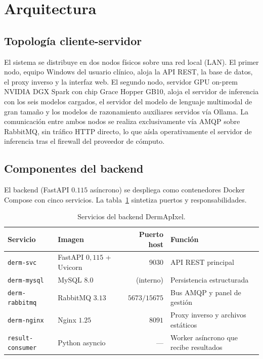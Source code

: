 \section{Arquitectura}
\label{sec:dermapixel-arq}

\subsection{Topología cliente-servidor}
\label{sec:dermapixel-topologia}

El sistema se distribuye en dos nodos físicos sobre una red local
(LAN). El primer nodo, equipo Windows del usuario clínico,
aloja la API REST, la base de datos, el
proxy inverso y la interfaz web. El segundo nodo, servidor GPU
on-prem NVIDIA DGX Spark con chip Grace Hopper GB10, aloja el
servidor de inferencia con los seis modelos cargados, el
servidor del modelo de lenguaje multimodal de gran tamaño y los
modelos de razonamiento auxiliares servidos vía Ollama. La
comunicación entre ambos nodos se realiza exclusivamente vía AMQP
sobre RabbitMQ, sin tráfico HTTP directo, lo que aísla
operativamente el servidor de inferencia tras el firewall del
proveedor de cómputo.

\subsection{Componentes del backend}
\label{sec:dermapixel-backend}

El backend (FastAPI $0.115$ asíncrono) se despliega como
contenedores Docker Compose con cinco servicios. La
tabla~\ref{tab:dermapixel-services} sintetiza puertos y
responsabilidades.

\begin{table}[H]
\centering
\footnotesize
\setlength{\tabcolsep}{4pt}
\renewcommand{\arraystretch}{0.95}
\caption{Servicios del backend DermApIxel.}
\label{tab:dermapixel-services}
\begin{tabular}{llrl}
\hline
Servicio                & Imagen               & Puerto host & Función \\
\hline
\texttt{derm-svc}       & FastAPI $0{,}115$ + Uvicorn  & $9030$ & API REST principal \\
\texttt{derm-mysql}     & MySQL $8.0$          & (interno) & Persistencia estructurada \\
\texttt{derm-rabbitmq}  & RabbitMQ $3.13$      & $5673 / 15675$ & Bus AMQP y panel de gestión \\
\texttt{derm-nginx}     & Nginx $1.25$         & $8091$ & Proxy inverso y archivos estáticos \\
\texttt{result-consumer}& Python asyncio       & ---          & Worker asíncrono que recibe resultados \\
\hline
\end{tabular}
\end{table}

